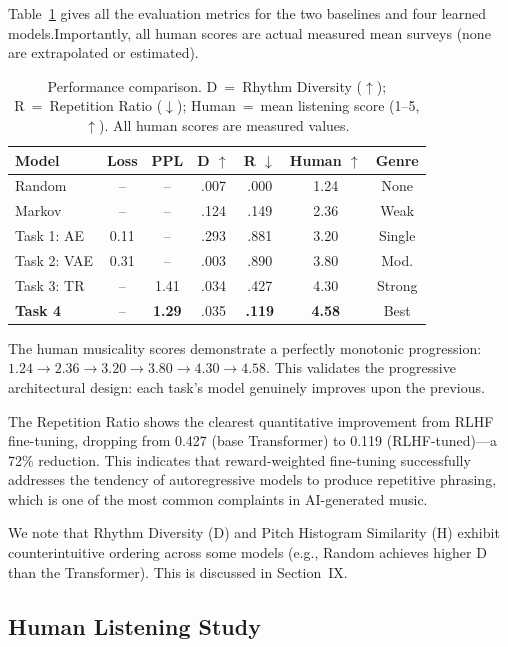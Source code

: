 \documentclass[conference]{IEEEtran}
\begin{document}
Table~\ref{tab:comp} gives all the evaluation metrics for the two baselines and four learned models.Importantly, all human scores are actual measured mean surveys (none are extrapolated or estimated).

\begin{table}[H]
\caption{Performance comparison. D~=~Rhythm Diversity ($\uparrow$); R~=~Repetition Ratio ($\downarrow$); Human~=~mean listening score (1--5, $\uparrow$). All human scores are measured values.}
\label{tab:comp}
\centering\small
\begin{tabular}{lcccccc}
\toprule
Model & Loss & PPL & D $\uparrow$ & R $\downarrow$ & Human $\uparrow$ & Genre \\
\midrule
Random & -- & -- & .007 & .000 & 1.24 & None \\
Markov & -- & -- & .124 & .149 & 2.36 & Weak \\
Task 1: AE & 0.11 & -- & .293 & .881 & 3.20 & Single \\
Task 2: VAE & 0.31 & -- & .003 & .890 & 3.80 & Mod. \\
Task 3: TR & -- & 1.41 & .034 & .427 & 4.30 & Strong \\
\textbf{Task 4} & -- & \textbf{1.29} & .035 & \textbf{.119} & \textbf{4.58} & Best \\
\bottomrule
\end{tabular}
\end{table}

The human musicality scores demonstrate a perfectly monotonic progression: $1.24 \to 2.36 \to 3.20 \to 3.80 \to 4.30 \to 4.58$. This validates the progressive architectural design: each task's model genuinely improves upon the previous.

The Repetition Ratio shows the clearest quantitative improvement from RLHF fine-tuning, dropping from 0.427 (base Transformer) to 0.119 (RLHF-tuned)---a 72\% reduction. This indicates that reward-weighted fine-tuning successfully addresses the tendency of autoregressive models to produce repetitive phrasing, which is one of the most common complaints in AI-generated music.

We note that Rhythm Diversity (D) and Pitch Histogram Similarity (H) exhibit counterintuitive ordering across some models (e.g., Random achieves higher D than the Transformer). This is discussed in Section~IX.

\subsection{Human Listening Study}
\end{document}
